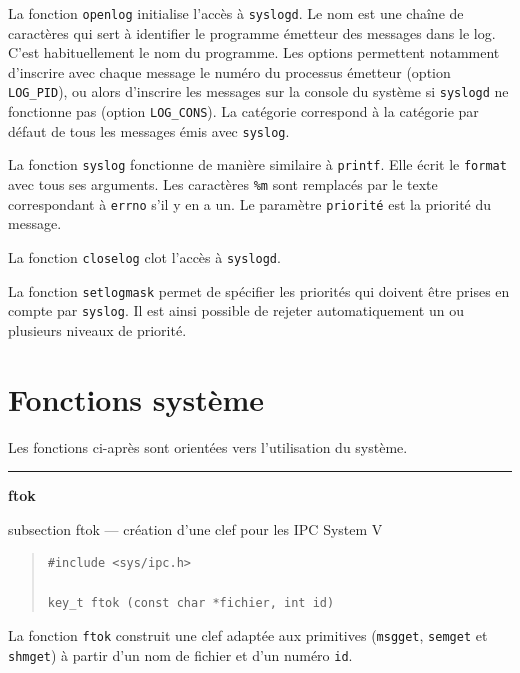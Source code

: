 \documentclass [twoside] {report}
\newcommand {\primitive} [1]
    {
	\phantomsection
	{\large \textbf {#1}}
	\addcontentsline {toc} {subsection} {#1}
    }
\newcommand {\separation}
    {
	\vspace {5mm}
	\nopagebreak
	\hrule
    }
\begin{document}
La fonction \texttt {openlog} initialise l'accès à \texttt {syslogd}. Le nom est
une chaîne de caractères qui sert à identifier le programme émetteur des
messages dans le log. C'est habituellement le nom du programme. Les
options permettent notamment d'inscrire avec chaque message le numéro du
processus émetteur (option \texttt {LOG\_PID}), ou alors d'inscrire les
messages sur la console du système si \texttt {syslogd} ne fonctionne pas
(option \texttt {LOG\_CONS}). La catégorie correspond à la catégorie par
défaut de tous les messages émis avec \texttt {syslog}.

La fonction \texttt {syslog} fonctionne de manière similaire à \texttt
{printf}.  Elle écrit le \texttt {format} avec tous ses arguments. Les
caractères \texttt {\%m} sont remplacés par le texte correspondant
à \texttt {errno} s'il y en a un.  Le paramètre \texttt {priorité}
est la priorité du message.

La fonction \texttt {closelog} clot l'accès à \texttt {syslogd}.

La fonction \texttt {setlogmask} permet de spécifier les priorités qui
doivent être prises en compte par \texttt {syslog}. Il est ainsi possible de
rejeter automatiquement un ou plusieurs niveaux de priorité.




\section {Fonctions système}



Les fonctions ci-après sont orientées vers l'utilisation du
système.



\separation 
\primitive {ftok} --- création d'une clef pour les IPC System V

\begin {quote}
\begin {verbatim}
#include <sys/ipc.h>

key_t ftok (const char *fichier, int id)
\end{verbatim}
\end {quote}

La fonction \texttt {ftok} construit une clef adaptée aux primitives
(\texttt {msgget}, \texttt {semget} et \texttt {shmget}) à partir d'un
nom de fichier et d'un numéro \texttt {id}.
\end{document}
